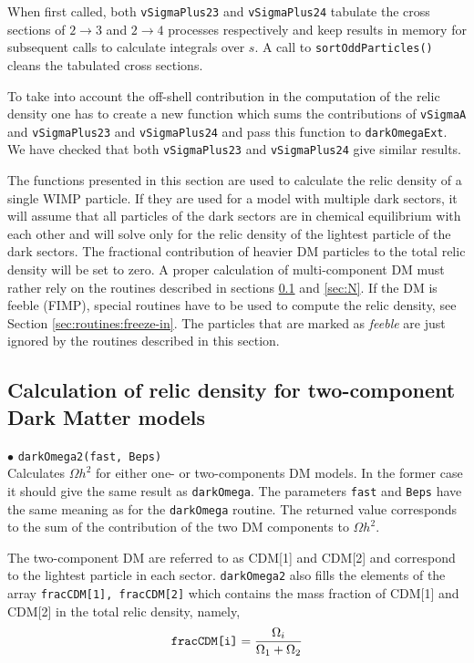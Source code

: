 \documentclass[12pt,a4paper]{article}
\begin{document}
When first called, both {\tt vSigmaPlus23} and {\tt vSigmaPlus24}  tabulate the cross sections of $2\to 3$ and $2\to 4$ processes respectively  
and keep results in memory for subsequent calls  to calculate integrals over $s$. A call to {\tt sortOddParticles()} cleans the  tabulated cross sections.


To take into account the off-shell contribution in the computation of the relic density one has to create a new function   which sums the contributions of {\tt vSigmaA} and 
{\tt vSigmaPlus23} and {\tt vSigmaPlus24} and pass this function to {\tt darkOmegaExt}. We have checked that both {\tt vSigmaPlus23} and {\tt vSigmaPlus24} give similar results.



The functions presented in this section are used to calculate the  relic density of a single WIMP
particle. If they are used for a model with multiple dark sectors, it will assume that all particles of the dark sectors are in chemical equilibrium with each other and will solve only for the relic density of the lightest  particle of the dark sectors. The fractional contribution of heavier  DM particles to the total relic density will be set to zero. A proper calculation of multi-component DM must rather rely on the routines described in sections \ref{sec:two} and \ref{sec:N}.  
If the DM is feeble (FIMP), special routines have to be used to compute the relic density, see Section \ref{sec:routines:freeze-in}. 
The particles that are marked as {\it
feeble} are just ignored by the  routines described in this section. 


\subsection{Calculation of relic density for  two-component Dark Matter models}
\label{sec:two}

$\bullet$ \verb|darkOmega2(fast, Beps)|\\
Calculates $\Omega h^2$ for either  one- or  two-components DM models. In the former case it should give the same result as \verb|darkOmega|.
The parameters {\tt fast} and {\tt Beps} have the same meaning as for the {\tt darkOmega} routine.
The returned value corresponds to the sum of the contribution of the two  DM components to  $\Omega h^2$.  


The two-component DM are  referred to as CDM[1] and CDM[2] and correspond to  the lightest particle in each sector. 
 \verb|darkOmega2| also fills the  elements of  the array {\tt fracCDM[1], fracCDM[2]} which contains the mass fraction
of CDM[1] and CDM[2] in the total relic density, namely,  
\begin{equation}
  \verb|fracCDM[i]|=\frac{\Omega_i}{ \Omega_1+\Omega_2}
\end{equation}
\end{document}
